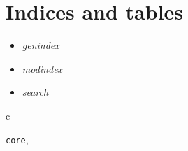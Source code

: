 \documentclass[letterpaper,10pt,english]{sphinxmanual}
\begin{document}
\chapter{Indices and tables}
\label{index:indices-and-tables}\begin{itemize}
\item {} 
\emph{genindex}

\item {} 
\emph{modindex}

\item {} 
\emph{search}

\end{itemize}


\renewcommand{\indexname}{Python Module Index}
\begin{theindex}
\def\bigletter#1{{\Large\sffamily#1}\nopagebreak\vspace{1mm}}
\bigletter{c}
\item {\texttt{core}}, \pageref{_templates/core:module-core}
\end{theindex}

\renewcommand{\indexname}{Index}
\printindex
\end{document}
